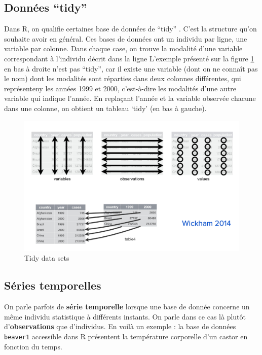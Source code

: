 \documentclass[
  french,
]{book}
\begin{document}
\hypertarget{donnuxe9es-tidy}{%
\subsection{Données ``tidy''}\label{donnuxe9es-tidy}}

Dans R, on qualifie certaines base de données de ``tidy'' \citep{wickham2014}. C'est la structure qu'on souhaite avoir en général. Ces bases de données ont un individu par ligne, une variable par colonne. Dans chaque case, on trouve la modalité d'une variable correspondant à l'individu décrit dans la ligne L'exemple présenté sur la figure \ref{fig:tidy} en bas à droite n'est pas ``tidy'', car il existe une variable (dont on ne connaît pas le nom) dont les modalités sont réparties dans deux colonnes différentes, qui représenteny les années 1999 et 2000, c'est-à-dire les modalités d'une autre variable qui indique l'année. En replaçant l'année et la variable observée chacune dans une colonne, on obtient un tableau `tidy' (en bas à gauche).

\begin{figure}
\includegraphics[width=22.36in]{docs/images/tidy} \caption{Tidy data sets}\label{fig:tidy}
\end{figure}

\hypertarget{suxe9ries-temporelles}{%
\subsection{Séries temporelles}\label{suxe9ries-temporelles}}

On parle parfois de \textbf{série temporelle} lorsque une base de donnée concerne un même individu statistique à différents instants. On parle dans ce cas là plutôt d'\textbf{observations} que d'individus. En voilà un exemple : la base de données \texttt{beaver1} accessible dans R présentent la température corporelle d'un castor en fonction du temps.
\end{document}
